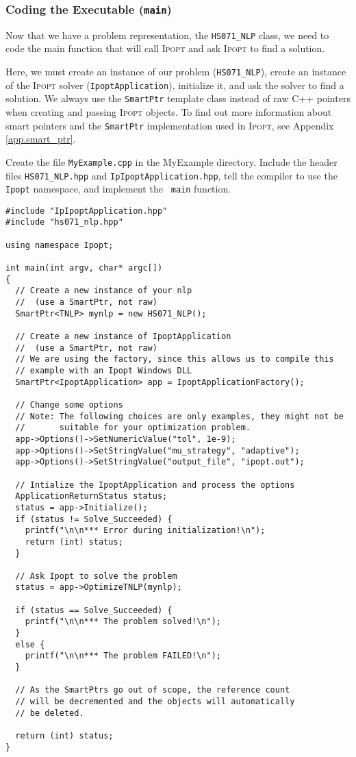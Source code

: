 \documentclass[10pt]{article}
\newcommand{\Ipopt}{\textsc{Ipopt}\xspace}
\begin{document}
\subsubsection{Coding the Executable (\texttt{main})}
Now that we have a problem representation, the {\tt HS071\_NLP} class,
we need to code the main function that will call \Ipopt and ask \Ipopt
to find a solution.

Here, we must create an instance of our problem ({\tt HS071\_NLP}),
create an instance of the \Ipopt solver (\texttt{IpoptApplication}),
initialize it, and ask the solver to find a solution. We always use
the \texttt{SmartPtr} template class instead of raw C++ pointers when
creating and passing \Ipopt objects. To find out more information
about smart pointers and the {\tt SmartPtr} implementation used in
\Ipopt, see Appendix \ref{app.smart_ptr}.

Create the file {\tt MyExample.cpp} in the MyExample directory.
Include the header files {\tt HS071\_NLP.hpp} and {\tt IpIpoptApplication.hpp}, tell
the compiler to use the {\tt Ipopt} namespace, and implement the {\tt
  main} function.

\begin{footnotesize}
\begin{verbatim}
#include "IpIpoptApplication.hpp"
#include "hs071_nlp.hpp"

using namespace Ipopt;

int main(int argv, char* argc[])
{
  // Create a new instance of your nlp 
  //  (use a SmartPtr, not raw)
  SmartPtr<TNLP> mynlp = new HS071_NLP();

  // Create a new instance of IpoptApplication
  //  (use a SmartPtr, not raw)
  // We are using the factory, since this allows us to compile this
  // example with an Ipopt Windows DLL
  SmartPtr<IpoptApplication> app = IpoptApplicationFactory();

  // Change some options
  // Note: The following choices are only examples, they might not be
  //       suitable for your optimization problem.
  app->Options()->SetNumericValue("tol", 1e-9);
  app->Options()->SetStringValue("mu_strategy", "adaptive");
  app->Options()->SetStringValue("output_file", "ipopt.out");

  // Intialize the IpoptApplication and process the options
  ApplicationReturnStatus status;
  status = app->Initialize();
  if (status != Solve_Succeeded) {
    printf("\n\n*** Error during initialization!\n");
    return (int) status;
  }

  // Ask Ipopt to solve the problem
  status = app->OptimizeTNLP(mynlp);

  if (status == Solve_Succeeded) {
    printf("\n\n*** The problem solved!\n");
  }
  else {
    printf("\n\n*** The problem FAILED!\n");
  }

  // As the SmartPtrs go out of scope, the reference count
  // will be decremented and the objects will automatically 
  // be deleted.

  return (int) status;
}
\end{verbatim} 
\end{footnotesize}
\end{document}

